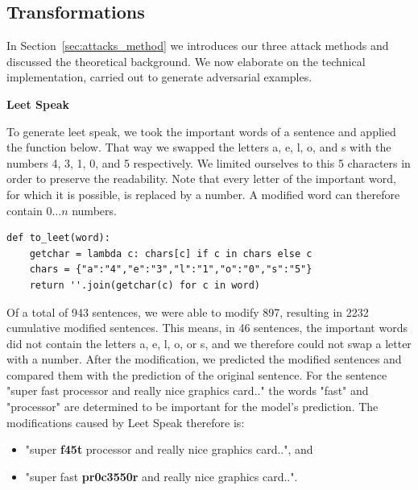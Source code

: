 \subsection{Transformations}
\label{sec:transformation_m}
In Section~\ref{sec:attacks_method} we introduces our three attack methods and discussed the theoretical background. We now elaborate on the technical implementation, carried out to generate adversarial examples.

\textbf{Leet Speak}

To generate leet speak, we took the important words of a sentence and applied the function below. That way we swapped the letters a, e, l, o, and s with the numbers 4, 3, 1, 0, and 5 respectively. We limited ourselves to this 5 characters in order to preserve the readability. Note that every letter of the important word, for which it is possible, is replaced by a number. A modified word can therefore contain ${0 \dots n}$ numbers.

\begin{lstlisting}
def to_leet(word):
    getchar = lambda c: chars[c] if c in chars else c
    chars = {"a":"4","e":"3","l":"1","o":"0","s":"5"}
    return ''.join(getchar(c) for c in word)
\end{lstlisting}
Of a total of 943 sentences, we were able to modify 897, resulting in 2232 cumulative modified sentences. This means, in 46 sentences, the important words did not contain the letters a, e, l, o, or s, and we therefore could not swap a letter with a number.
After the modification, we predicted the modified sentences and compared them with the prediction of the original sentence. 
For the sentence "super fast processor and really nice graphics card.." the words "fast" and "processor" are determined to be important for the model's prediction. The modifications caused by Leet Speak therefore is:

\begin{itemize}
    \item "super \textbf{f45t} processor and really nice graphics card..", and
    \item "super fast \textbf{pr0c3550r} and really nice graphics card..".
\end{itemize}


